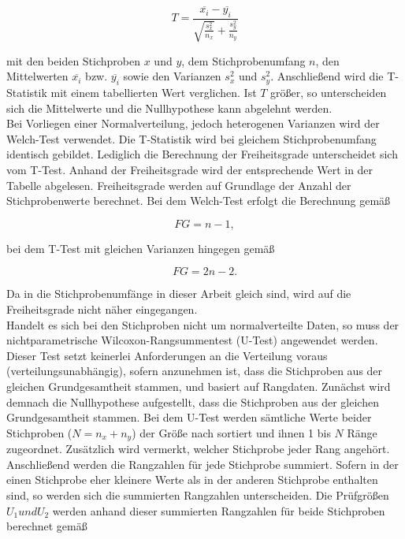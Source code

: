 \begin{equation}
T = \frac{\overline{x_i} - \overline{y_i}}{\sqrt{\frac{s_{x}^2}{n_x}} + \frac{s_{y}^2}{n_y}}
\end{equation}

mit den beiden Stichproben $x$ und $y$, dem Stichprobenumfang $n$, den Mittelwerten $\overline{x_i}$ bzw. $\overline{y_i}$ sowie den Varianzen $s_{x}^2$ und $s_{y}^2$. Anschließend wird die T-Statistik mit einem tabellierten  Wert verglichen. Ist $T$ größer, so unterscheiden sich die Mittelwerte und die Nullhypothese kann abgelehnt werden. \parencite{frank_einfach_2006, hedderich_angewandte_2016}\\

Bei Vorliegen einer Normalverteilung, jedoch heterogenen Varianzen wird der Welch-Test verwendet. Die T-Statistik wird bei gleichem Stichprobenumfang identisch gebildet. Lediglich die Berechnung der Freiheitsgrade unterscheidet sich vom T-Test. Anhand der Freiheitsgrade wird der entsprechende Wert in der Tabelle abgelesen. Freiheitsgrade werden auf Grundlage der Anzahl der Stichprobenwerte berechnet. Bei dem Welch-Test erfolgt die Berechnung gemäß 

\begin{equation}
FG = n - 1,
\end{equation}

bei dem T-Test mit gleichen Varianzen hingegen gemäß

\begin{equation}
FG = 2n - 2.
\end{equation}

Da in die Stichprobenumfänge in dieser Arbeit gleich sind, wird auf die Freiheitsgrade nicht näher eingegangen. \parencite{hedderich_angewandte_2016, cressie_how_1986}\\

Handelt es sich bei den Stichproben nicht um normalverteilte Daten, so muss der nichtparametrische Wilcoxon-Rangsummentest (U-Test) angewendet werden. Dieser Test setzt keinerlei Anforderungen an die Verteilung voraus (verteilungsunabhängig), sofern anzunehmen ist, dass die Stichproben aus der gleichen Grundgesamtheit stammen, und basiert auf Rangdaten. Zunächst wird demnach die Nullhypothese aufgestellt, dass die Stichproben aus der gleichen Grundgesamtheit stammen. Bei dem U-Test werden sämtliche Werte beider Stichproben ($N = n_x + n_y$) der Größe nach sortiert und ihnen 1 bis $N$ Ränge zugeordnet. Zusätzlich wird vermerkt, welcher Stichprobe jeder Rang angehört. Anschließend werden die Rangzahlen für jede Stichprobe summiert. Sofern in der einen Stichprobe eher kleinere Werte als  in der anderen Stichprobe enthalten sind, so werden sich die summierten Rangzahlen unterscheiden. Die Prüfgrößen $U_1 und U_2$ werden anhand dieser summierten Rangzahlen für beide Stichproben berechnet gemäß

